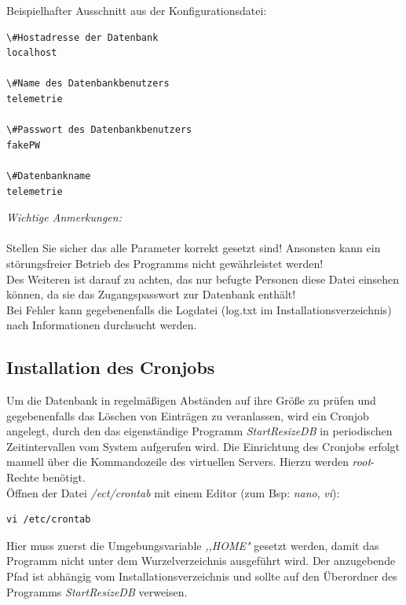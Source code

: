 \documentclass[fontsize = 12pt, paper = a4]{scrreprt}
\begin{document}
\newpage

Beispielhafter Ausschnitt aus der Konfigurationsdatei:

\vspace*{4mm}
\begin{lstlisting}[frame=single]
\#Hostadresse der Datenbank
localhost

\#Name des Datenbankbenutzers
telemetrie

\#Passwort des Datenbankbenutzers
fakePW

\#Datenbankname
telemetrie 
\end{lstlisting} 
\vspace*{-2mm}

    


\textit{Wichtige Anmerkungen:} \\ \\
Stellen Sie sicher das alle Parameter korrekt gesetzt sind! Ansonsten kann ein störungsfreier Betrieb des Programms nicht gewährleistet werden!\\
Des Weiteren ist darauf zu achten, das nur befugte Personen diese Datei einsehen können, da sie das Zugangspasswort zur Datenbank enthält!\\
Bei Fehler kann gegebenenfalls die Logdatei (log.txt im Installationsverzeichnis) nach Informationen durchsucht werden.

\subsection{Installation des Cronjobs}

Um die Datenbank in regelmäßigen Abständen auf ihre Größe zu prüfen und gegebenenfalls das Löschen von Einträgen zu veranlassen, wird ein Cronjob angelegt, durch den das eigenständige Programm \textit{StartResizeDB} in periodischen Zeitintervallen vom System aufgerufen wird.
Die Einrichtung des Cronjobs erfolgt manuell über die Kommandozeile des virtuellen Servers. Hierzu werden \textit{root}-Rechte benötigt.\\

Öffnen der Datei \textit{/ect/crontab} mit einem Editor (zum Bsp: \textit{nano}, \textit{vi}): 

\vspace*{4mm}
\begin{lstlisting}[frame=single]
 vi /etc/crontab  
\end{lstlisting} 
\vspace*{-2mm}
   

Hier muss zuerst die Umgebungsvariable \textit{,,HOME"} gesetzt werden, damit das Programm nicht unter dem Wurzelverzeichnis ausgeführt wird. Der anzugebende Pfad ist abhängig vom Installationsverzeichnis und sollte auf den Überordner des Programms \textit{StartResizeDB} verweisen.
 
\end{document}
